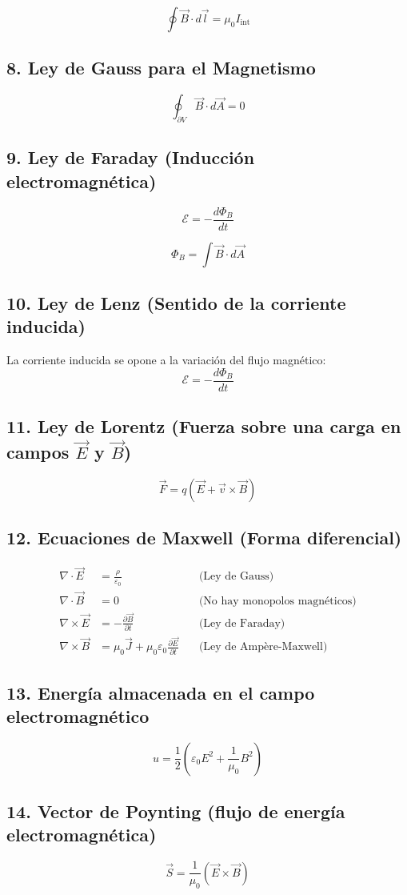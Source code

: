\[
\oint \vec{B} \cdot d\vec{l} = \mu_0 I_{\text{int}}
\]

\subsection*{8. Ley de Gauss para el Magnetismo}

\[
\oint_{\partial V} \vec{B} \cdot d\vec{A} = 0
\]

\subsection*{9. Ley de Faraday (Inducción electromagnética)}

\[
\mathcal{E} = -\frac{d\Phi_B}{dt}
\]

\[
\Phi_B = \int \vec{B} \cdot d\vec{A}
\]

\subsection*{10. Ley de Lenz (Sentido de la corriente inducida)}

La corriente inducida se opone a la variación del flujo magnético:
\[
\mathcal{E} = -\frac{d\Phi_B}{dt}
\]

\subsection*{11. Ley de Lorentz (Fuerza sobre una carga en campos \(\vec{E}\) y \(\vec{B}\))}

\[
\vec{F} = q (\vec{E} + \vec{v} \times \vec{B})
\]

\subsection*{12. Ecuaciones de Maxwell (Forma diferencial)}

\begin{align*}
\nabla \cdot \vec{E} &= \frac{\rho}{\varepsilon_0} \quad &\text{(Ley de Gauss)} \\
\nabla \cdot \vec{B} &= 0 \quad &\text{(No hay monopolos magnéticos)} \\
\nabla \times \vec{E} &= -\frac{\partial \vec{B}}{\partial t} \quad &\text{(Ley de Faraday)} \\
\nabla \times \vec{B} &= \mu_0 \vec{J} + \mu_0 \varepsilon_0 \frac{\partial \vec{E}}{\partial t} \quad &\text{(Ley de Ampère-Maxwell)}
\end{align*}

\subsection*{13. Energía almacenada en el campo electromagnético}

\[
u = \frac{1}{2} \left( \varepsilon_0 E^2 + \frac{1}{\mu_0} B^2 \right)
\]

\subsection*{14. Vector de Poynting (flujo de energía electromagnética)}

\[
\vec{S} = \frac{1}{\mu_0} (\vec{E} \times \vec{B})
\]
